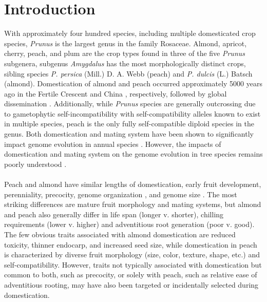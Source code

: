 \documentclass[12pt]{article}
\begin{document}
\section*{Introduction}
With approximately four hundred species, including multiple domesticated crop species, \emph{Prunus} is the largest genus in the family Rosaceae.
%
Almond, apricot, cherry, peach, and plum are the crop types found in three of the five \emph{Prunus} subgenera, subgenus \emph{Amygdalus} has the most morphologically distinct crops, sibling species \emph{P. persica} (Mill.) D. A. Webb (peach) and \emph{P. dulcis} (L.) Batsch (almond).
%
Domestication of almond and peach occurred approximately 5000 years ago in the Fertile Crescent and China \citep{zohary2012domestication}, respectively, followed by global dissemination \citep{hedrick1917peaches, edwards1975almond, gradziel2011origin, zheng2014archaeological}.
%
Additionally, while \emph{Prunus} species are generally outcrossing due to gametophytic self-incompatibility with self-compatibility alleles known to exist in multiple species, peach is the only fully self-compatible diploid species in the genus. 
%
Both domestication and mating system have been shown to significantly impact genome evolution in annual species \citep{glemin2006impact, doebley2006molecular, slotte2013capsella}. 
%
However, the impacts of domestication and mating system on the genome evolution in tree species remains poorly understood \citep{mckey2010evolutionary, miller2011forest}.
\\
\\
%
Peach and almond have similar lengths of domestication, early fruit development, perenniality, precocity, genome organization \citep{arus2012peach}, and genome size \citep{arumuganathan1991nuclear, dickson1992nuclear, baird1994estimating, loureiro2007two}.
%
The most striking differences are mature fruit morphology and mating systems, but almond and peach also generally differ in life span (longer v. shorter), chilling requirements (lower v. higher) and adventitious root generation (poor v. good).
%
The few obvious traits associated with almond domestication are reduced toxicity, thinner endocarp, and increased seed size, while domestication in peach is characterized by diverse fruit morphology (size, color, texture, shape, etc.) and self-compatibility.
%
However, traits not typically associated with domestication but common to both, such as precocity, or solely with peach, such as relative ease of adventitious rooting, may have also been targeted or incidentally selected during domestication. 
\end{document}
